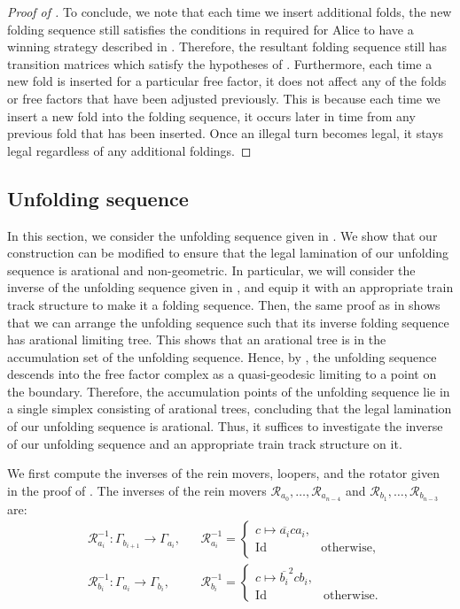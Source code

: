 \documentclass[11pt, letterpaper]{amsart}
\theoremstyle{plain}
\theoremstyle{definition}
\newcommand{\G}{\Gamma}
\newcommand{\cR}{\mathcal{R}}
\newcommand{\ov}[1]{\overline{#1}}
\begin{document}
\begin{proof}[Proof of ]
    To conclude, we note that each time we insert additional folds, the new folding sequence still satisfies the conditions in  required for Alice to have a winning strategy described in .
    Therefore, 
    the resultant folding sequence still has transition matrices which satisfy the hypotheses of . Furthermore, each time a new fold is inserted for a particular free factor, it does not affect any of the folds or free factors that have been adjusted previously. This is because each time we insert a new fold into the folding sequence, it occurs later in time from any previous fold that has been inserted. Once an illegal turn becomes legal, it stays legal regardless of any additional foldings.
\end{proof}

\subsection{Unfolding sequence} In this section, we consider the unfolding sequence given in . We show that our construction can be modified to ensure that the legal lamination of our unfolding sequence is arational and non-geometric. In particular,
we will consider the inverse of the unfolding sequence given in , and equip it with an
appropriate train track structure to make it a folding sequence.
Then, the same proof as in  shows that we can arrange
the unfolding sequence such that its inverse folding sequence has arational
limiting tree. This shows that an arational tree is in the accumulation set of
the unfolding sequence. Hence, by \cite[Theorem 1.1]{bestvina2015boundary}, the
unfolding sequence descends into the free factor complex as a quasi-geodesic
limiting to a point on the boundary. Therefore, the accumulation points of the
unfolding sequence lie in a single simplex consisting of arational trees, concluding that
the legal lamination of our unfolding sequence is arational.
Thus, it suffices to investigate the inverse of our unfolding sequence and
an appropriate train track structure on it.


We first compute the inverses of the rein movers, loopers, and the rotator given
in the proof of . The inverses of the rein movers $\cR_{a_0},\ldots,\cR_{a_{n-4}}$ and $\cR_{b_{1}},\ldots,\cR_{b_{n-3}}$ are:
\begin{align*}
    &\cR_{a_i}^{-1}: \G_{b_{i+1}} \to \G_{a_i},
    &&\cR_{a_i}^{-1} =
    \begin{cases}
    c \mapsto \ov{a_i}ca_i,\\
    \text{Id} & \text{otherwise},
    \end{cases}\\
    &\cR_{b_i}^{-1}: \G_{a_i} \to \G_{b_i},
    &&\cR_{b_i}^{-1} =
    \begin{cases}
    c \mapsto \ov{b_i}^2cb_i,\\
    \text{Id} & \text{otherwise}.
    \end{cases}
\end{align*}
\end{document}
